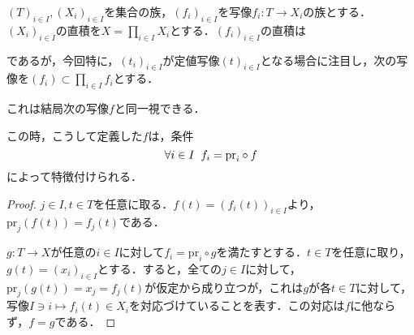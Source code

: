 \documentclass[uplatex,dvipdfmx]{jsreport}
\begin{document}
\begin{proposition}[積の普遍性]
    $(T)_{i\in I}, (X_i)_{i\in I}$を集合の族，$(f_i)_{i\in I}$を写像$f_i:T\to X_i$の族とする．$(X_i)_{i\in I}$の直積を$X=\prod_{i\in I}X_i$とする．$(f_i)_{i\in I}$の直積は
    \begin{center}\end{center}
    であるが，今回特に，$(t_i)_{i\in I}$が定値写像$(t)_{i\in I}$となる場合に注目し，次の写像を$(f_i)\subset \prod_{i\in I}f_i$とする．
    \begin{center}\end{center}
    これは結局次の写像$f$と同一視できる．
    \begin{center}\end{center}
    この時，こうして定義した$f$は，条件$$\forall i\in I \hspace{2mm} f_i=\mathrm{pr}_i\circ f$$
    によって特徴付けられる．
\end{proposition}
\begin{proof}
    $j\in I, t\in T$を任意に取る．$f(t)=(f_i(t))_{i\in I}$より，$\mathrm{pr}_j(f(t))=f_j(t)$である．

    $g:T\to X$が任意の$i\in I$に対して$f_i=\mathrm{pr}_i\circ g$を満たすとする．$t\in T$を任意に取り，$g(t)=(x_i)_{i\in I}$とする．すると，全ての$j\in I$に対して，$\mathrm{pr}_j(g(t))=x_j=f_j(t)$が仮定から成り立つが，これは$g$が各$t\in T$に対して，写像$I\ni i\mapsto f_i(t)\in X_i$を対応づけていることを表す．この対応は$f$に他ならず，$f=g$である．
\end{proof}
\end{document}
